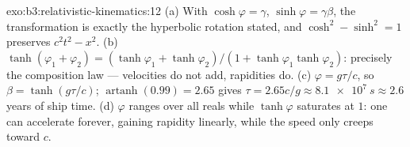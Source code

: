 \begin{solution}{exo:b3:relativistic-kinematics:12}
(a) With $\cosh\varphi = \gamma$, $\sinh\varphi = \gamma\beta$, the
transformation is exactly the hyperbolic rotation stated, and
$\cosh^2 - \sinh^2 = 1$ preserves $c^2t^2 - x^2$. (b)
$\tanh(\varphi_1 + \varphi_2) = (\tanh\varphi_1 + \tanh\varphi_2)/(1 +
\tanh\varphi_1\tanh\varphi_2)$: precisely the composition law ---
velocities do not add, rapidities do. (c) $\varphi = g\tau/c$, so
$\beta = \tanh(g\tau/c)$; $\operatorname{artanh}(0.99) = 2.65$ gives
$\tau = 2.65c/g \approx \qty{8.1e7}{s} \approx 2.6$ years of ship
time. (d) $\varphi$ ranges over all reals while $\tanh\varphi$
saturates at $1$: one can accelerate forever, gaining rapidity
linearly, while the speed only creeps toward $c$.
\end{solution}

